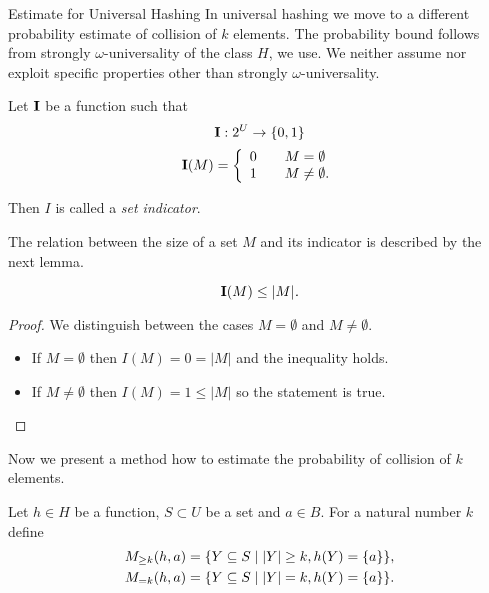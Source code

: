 \begin{section}{Estimate for Universal Hashing}
In universal hashing we move to a different probability estimate of collision of $k$ elements. The probability bound follows from strongly $\omega$-universality of the class $H$, we use. We neither assume nor exploit specific properties other than strongly $\omega$-universality.
\begin{definition}
Let $\mathbf{I}$ be a function such that
\begin{displaymath}
\mathbf{I}: 2^U \rightarrow \lbrace 0, 1 \rbrace
\end{displaymath}
\begin{displaymath}
\mathbf{I}(M) = \left\{ 
\begin{array}{l l}
  0 & \quad M = \emptyset \\
  1 & \quad M \neq \emptyset \text{.} \\
\end{array} \right. 
\end{displaymath}

Then $I$ is called a \emph{set indicator}.
\end{definition}

The relation between the size of a set $M$ and its indicator is described by the next lemma.
\begin{lemma}
\[\mathbf{I}(M) \leq |M| \textit{.} \]
\end{lemma}
\begin{proof} We distinguish between the cases $M = \emptyset$ and $M \neq \emptyset$.
\begin{itemize}
\item If $M = \emptyset$ then $I(M) = 0 = |M|$ and the inequality holds. 
\item If $M \neq \emptyset$ then $I(M) = 1 \leq |M|$ so the statement is true.
\end{itemize}
\end{proof}

Now we present a method how to estimate the probability of collision of $k$ elements.
\begin{definition}
Let $h \in H$ be a function, $S \subset U$ be a set and $a \in B$. For a natural number $k$ define
\[
\begin{split}
M_{\geq k}(h, a) & = \{Y \subseteq S \mid |Y| \geq k, h(Y) = \{a\}\}, \\
M_{= k}(h, a) & = \{Y \subseteq S \mid |Y| = k, h(Y) = \{a\}\}  \text{.}
\end{split}
\]
\end{definition}


\end{section}
